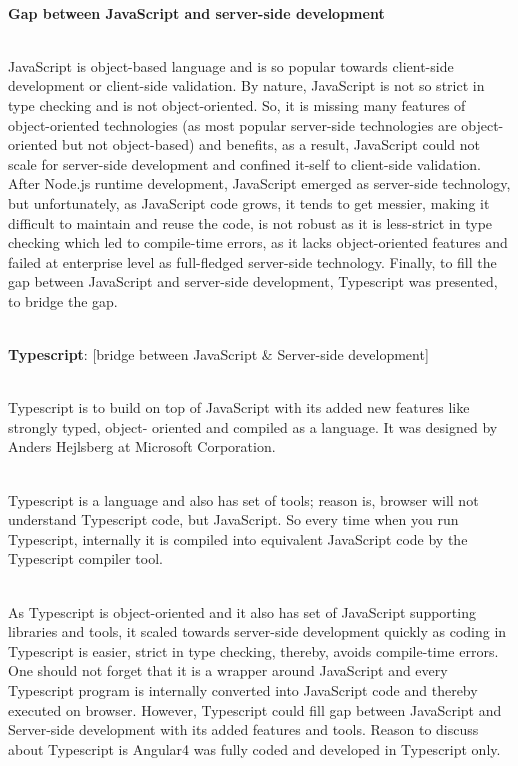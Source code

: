 \documentclass{article}
\begin{document}
\noindent \\ {\large \textbf{Gap between JavaScript and server-side development}}

\noindent \\ JavaScript is object-based language and is so popular towards client-side development or client-side validation. By nature, JavaScript is not so strict in type checking and is not object-oriented. So, it is missing many features of object-oriented technologies (as most popular server-side technologies are object-oriented but not object-based) and benefits, as a result, JavaScript could not scale for server-side development and confined it-self to client-side validation. After Node.js runtime development, JavaScript emerged as server-side technology, but unfortunately, as JavaScript code grows, it tends to get messier, making it difficult to maintain and reuse the code, is not robust as it is less-strict in type checking which led to compile-time errors, as it lacks object-oriented features and failed at enterprise level as full-fledged server-side technology. Finally, to fill the gap between JavaScript and server-side development, Typescript was presented, to bridge the gap.

\noindent  

\noindent \\ \textbf{Typescript}: [bridge between JavaScript \& Server-side development]

\noindent \\ Typescript is to build on top of JavaScript with its added new features like strongly typed, object- oriented and compiled as a language. It was designed by Anders Hejlsberg at Microsoft Corporation.

\noindent \\ Typescript is a language and also has set of tools; reason is, browser will not understand Typescript code, but JavaScript. So every time when you run Typescript, internally it is compiled into equivalent JavaScript code by the Typescript compiler tool.

\noindent \\ As Typescript is object-oriented and it also has set of JavaScript supporting libraries and tools, it scaled towards server-side development quickly as coding in Typescript is easier, strict in type checking, thereby, avoids compile-time errors. One should not forget that it is a wrapper around JavaScript and every Typescript program is internally converted into JavaScript code and thereby executed on browser. However, Typescript could fill gap between JavaScript and Server-side development with its added features and tools. Reason to discuss about Typescript is Angular4 was fully coded and developed in Typescript only.
\end{document}
